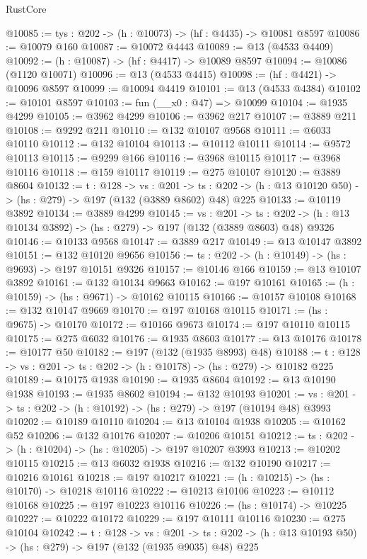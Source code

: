 \begin{lexlean}{RustCore}
\begin{coremodule}
@10085 := {tys : @202} -> (h : @10073) -> (hf : @4435) -> @10081 @8597
@10086 := @10079 @160
@10087 := @10072 @4443
@10089 := @13 (@4533 @4409)
@10092 := (h : @10087) -> (hf : @4417) -> @10089 @8597
@10094 := @10086 (@1120 @10071)
@10096 := @13 (@4533 @4415)
@10098 := (hf : @4421) -> @10096 @8597
@10099 := @10094 @4419
@10101 := @13 (@4533 @4384)
@10102 := @10101 @8597
@10103 := fun (__x0 : @47) => @10099
@10104 := @1935 @4299
@10105 := @3962 @4299
@10106 := @3962 @217
@10107 := @3889 @211
@10108 := @9292 @211
@10110 := @132 @10107 @9568
@10111 := @6033 @10110
@10112 := @132 @10104
@10113 := @10112 @10111
@10114 := @9572 @10113
@10115 := @9299 @166
@10116 := @3968 @10115
@10117 := @3968 @10116
@10118 := @159 @10117
@10119 := @275 @10107
@10120 := @3889 @8604
@10132 := {t : @128} ->
  {vs : @201} ->
  {ts : @202} -> (h : @13 @10120 @50) -> (hs : @279) -> @197 (@132 (@3889 @8602) @48) @225
@10133 := @10119 @3892
@10134 := @3889 @4299
@10145 := {vs : @201} ->
  {ts : @202} -> (h : @13 @10134 @3892) -> (hs : @279) -> @197 (@132 (@3889 @8603) @48) @9326
@10146 := @10133 @9568
@10147 := @3889 @217
@10149 := @13 @10147 @3892
@10151 := @132 @10120 @9656
@10156 := {ts : @202} -> (h : @10149) -> (hs : @9693) -> @197 @10151 @9326
@10157 := @10146 @166
@10159 := @13 @10107 @3892
@10161 := @132 @10134 @9663
@10162 := @197 @10161
@10165 := (h : @10159) -> (hs : @9671) -> @10162 @10115
@10166 := @10157 @10108
@10168 := @132 @10147 @9669
@10170 := @197 @10168 @10115
@10171 := (hs : @9675) -> @10170
@10172 := @10166 @9673
@10174 := @197 @10110 @10115
@10175 := @275 @6032
@10176 := @1935 @8603
@10177 := @13 @10176
@10178 := @10177 @50
@10182 := @197 (@132 (@1935 @8993) @48)
@10188 := {t : @128} -> {vs : @201} -> {ts : @202} -> (h : @10178) -> (hs : @279) -> @10182 @225
@10189 := @10175 @1938
@10190 := @1935 @8604
@10192 := @13 @10190 @1938
@10193 := @1935 @8602
@10194 := @132 @10193
@10201 := {vs : @201} -> {ts : @202} -> (h : @10192) -> (hs : @279) -> @197 (@10194 @48) @3993
@10202 := @10189 @10110
@10204 := @13 @10104 @1938
@10205 := @10162 @52
@10206 := @132 @10176
@10207 := @10206 @10151
@10212 := {ts : @202} -> (h : @10204) -> (hs : @10205) -> @197 @10207 @3993
@10213 := @10202 @10115
@10215 := @13 @6032 @1938
@10216 := @132 @10190
@10217 := @10216 @10161
@10218 := @197 @10217
@10221 := (h : @10215) -> (hs : @10170) -> @10218 @10116
@10222 := @10213 @10106
@10223 := @10112 @10168
@10225 := @197 @10223 @10116
@10226 := (hs : @10174) -> @10225
@10227 := @10222 @10172
@10229 := @197 @10111 @10116
@10230 := @275 @10104
@10242 := {t : @128} ->
  {vs : @201} ->
  {ts : @202} -> (h : @13 @10193 @50) -> (hs : @279) -> @197 (@132 (@1935 @9035) @48) @225

\end{coremodule}
\end{lexlean}
